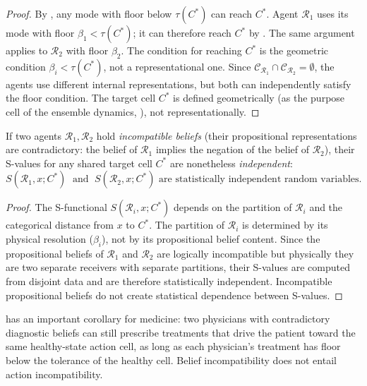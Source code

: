 \begin{proof}
By , any mode with floor below $\tau(C^*)$ can
reach $C^*$.  Agent $\mathcal{R}_1$ uses its mode with floor $\beta_1 <
\tau(C^*)$; it can therefore reach $C^*$ by .
The same argument applies to $\mathcal{R}_2$ with floor $\beta_2$.  The
condition for reaching $C^*$ is the geometric condition $\beta_i < \tau(C^*)$,
not a representational one.  Since $\mathcal{C}_{\mathcal{R}_1} \cap
\mathcal{C}_{\mathcal{R}_2} = \emptyset$, the agents use different internal
representations, but both can independently satisfy the floor condition.
The target cell $C^*$ is defined geometrically (as the purpose cell of the
ensemble dynamics, ), not representationally.
\end{proof}

\begin{theorem}
\label{thm:belief-incompatibility}
If two agents $\mathcal{R}_1, \mathcal{R}_2$ hold \emph{incompatible beliefs}
(their propositional representations are contradictory: the belief of
$\mathcal{R}_1$ implies the negation of the belief of $\mathcal{R}_2$), their
S-values for any shared target cell $C^*$ are nonetheless \emph{independent}:
\[
  S(\mathcal{R}_1, x; C^*) \;\text{ and }\; S(\mathcal{R}_2, x; C^*)
  \text{ are statistically independent random variables.}
\]
\end{theorem}

\begin{proof}
The S-functional $S(\mathcal{R}_i, x; C^*)$ depends on the partition of
$\mathcal{R}_i$ and the categorical distance from $x$ to $C^*$.  The partition
of $\mathcal{R}_i$ is determined by its physical resolution ($\beta_i$), not
by its propositional belief content.  Since the propositional beliefs of
$\mathcal{R}_1$ and $\mathcal{R}_2$ are logically incompatible but physically
they are two separate receivers with separate partitions, their S-values are
computed from disjoint data and are therefore statistically independent.
Incompatible propositional beliefs do not create statistical dependence between
S-values.
\end{proof}

\begin{remark}
 has an important corollary for medicine:
two physicians with contradictory diagnostic beliefs can still prescribe
treatments that drive the patient toward the same healthy-state action cell,
as long as each physician's treatment has floor below the tolerance of the
healthy cell.  Belief incompatibility does not entail action incompatibility.
\end{remark}

